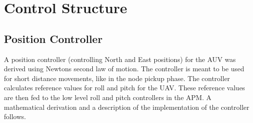 \chapter{Control Structure}
\section{Position Controller}
\label{pos}
A position controller (controlling North and East positions) for the AUV was derived using Newtons second law of motion. The controller is meant to be used for short distance movements, like in the node pickup phase. The controller calculates reference values for roll and pitch for the UAV. These reference values are then fed to the low level roll and pitch controllers in the APM. A mathematical derivation and a description of the implementation of the controller follows. 
